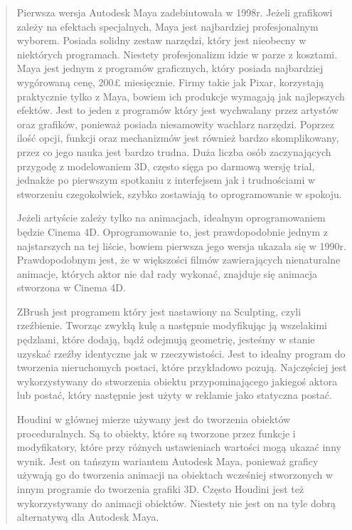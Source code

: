 \begin{quotation}
\indent Pierwsza wersja Autodesk Maya zadebiutowała w 1998r. Jeżeli grafikowi zależy na efektach specjalnych, Maya jest najbardziej profesjonalnym wyborem. Posiada solidny zestaw narzędzi, który jest nieobecny w niektórych programach. Niestety profesjonalizm idzie w parze z kosztami. Maya jest jednym z programów graficznych, który posiada najbardziej wygórowaną cenę, 200£ miesięcznie. Firmy takie jak Pixar, korzystają praktycznie tylko z Maya, bowiem ich produkcje wymagają jak najlepszych efektów. Jest to jeden z programów który jest wychwalany przez artystów oraz grafików, ponieważ posiada niesamowity wachlarz narzędzi. Poprzez ilość opcji, funkcji oraz mechanizmów jest również bardzo skomplikowany, przez co jego nauka jest bardzo trudna. Duża liczba osób zaczynających przygodę z modelowaniem 3D, często sięga po darmową wersję trial, jednakże po pierwszym spotkaniu z interfejsem jak i trudnościami w stworzeniu czegokolwiek, szybko zostawiają to oprogramowanie w spokoju.

\indent Jeżeli artyście zależy tylko na animacjach, idealnym oprogramowaniem będzie Cinema 4D. Oprogramowanie to, jest prawdopodobnie jednym z najstarszych na tej liście, bowiem pierwsza jego wersja ukazała się w 1990r. Prawdopodobnym jest, że w większości filmów zawierających nienaturalne animacje, których aktor nie dał rady wykonać, znajduje się animacja stworzona w Cinema 4D. 

\indent ZBrush jest programem który jest nastawiony na Sculpting, czyli rzeźbienie. Tworząc zwykłą kulę a następnie modyfikując ją wszelakimi pędzlami, które dodają, bądź odejmują geometrię, jesteśmy w stanie uzyskać rzeźby identyczne jak w rzeczywistości. Jest to idealny program do tworzenia nieruchomych postaci, które przykładowo pozują. Najczęściej jest wykorzystywany do stworzenia obiektu przypominającego jakiegoś aktora lub postać, który następnie jest użyty w reklamie jako statyczna postać. 

\indent Houdini w głównej mierze używany jest do tworzenia obiektów proceduralnych. Są to obiekty, które są tworzone przez funkcje i modyfikatory, które przy różnych ustawieniach wartości mogą ukazać inny wynik. Jest on tańszym wariantem Autodesk Maya, ponieważ graficy używają go do tworzenia animacji na obiektach wcześniej stworzonych w innym programie do tworzenia grafiki 3D. Często Houdini jest też wykorzystywany do animacji obiektów. Niestety nie jest on na tyle dobrą alternatywą dla Autodesk Maya.


\end{quotation}
